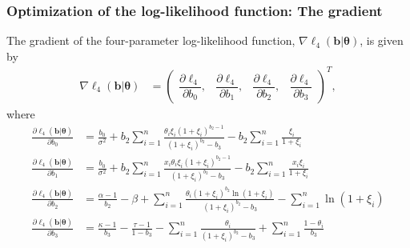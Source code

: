 \documentclass[11pt, letterpaper]{article}
\numberwithin{equation}{section}
\begin{document}
\subsubsection{Optimization of the log-likelihood function: The gradient}
The gradient of the four-parameter log-likelihood function, $\nabla \ell_4(\bm b | \bm \theta)$, is given by
\begin{align*}
\nabla \ell_4(\bm b | \bm \theta) &= \begin{pmatrix}
\dfrac{\partial \ell_4}{\partial b_0},   & \dfrac{\partial \ell_4}{\partial b_1} , & \dfrac{\partial \ell_4}{\partial b_2} , & \dfrac{\partial \ell_4}{\partial b_3}
\end{pmatrix}^T,
\end{align*}
where 
\begin{align*}
\frac{\partial \ell_4 (\bm b | \bm \theta)}{\partial b_0}   &= \frac{b_0}{\sigma^2} + b_2\sum_{i=1}^n \frac{\theta_i \xi_i (1+\xi_i)^{b_2-1}}{(1+\xi_i)^{b_2}-b_3} - b_2\sum_{i=1}^n \frac{\xi_i}{1+\xi_i}
\\
\frac{\partial \ell_4 (\bm b | \bm \theta)}{\partial b_1}   &= \frac{b_0}{\sigma^2} + b_2\sum_{i=1}^n \frac{x_i\theta_i \xi_i (1+\xi_i)^{b_2-1}}{(1+\xi_i)^{b_2}-b_3} - b_2\sum_{i=1}^n \frac{x_i\xi_i}{1+\xi_i}
\\
\frac{\partial \ell_4 (\bm b | \bm \theta)}{\partial b_2}   &= \frac{\alpha-1}{b_2} - \beta + \sum_{i=1}^n \frac{\theta_i (1+\xi_i)^{b_2}\ln(1+\xi_i)}{(1+\xi_i)^{b_2}-b_3}  -\sum_{i=1}^n  \ln (1+\xi_i) \\
\frac{\partial \ell_4 (\bm b | \bm \theta)}{\partial b_3}   &= \frac{\kappa-1}{b_3} -\frac{\tau -1}{1-b_3 } -\sum_{i=1}^n \frac{\theta_i}{(1 + \xi_i)^{b_2} - b_3 } + \sum_{i=1}^n \frac{1-\theta_i}{b_3} \\
\end{align*}
\end{document}
